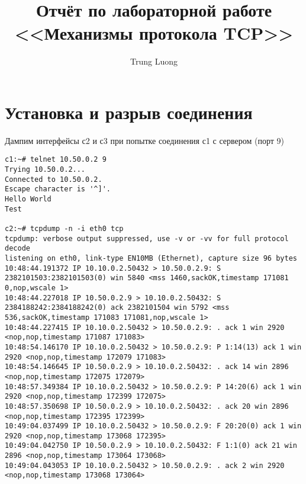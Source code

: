 \documentclass[a4paper,12pt]{article}
\title{Отчёт по лабораторной работе \\ <<Механизмы протокола TCP>>}
\author{Trung Luong}
\begin{document}
\maketitle

\tableofcontents


\section{Установка и разрыв соединения}

Дампим интерфейсы с2 и с3 при попытке соединения с1 с сервером (порт 9)

\begin{lstlisting}
c1:~# telnet 10.50.0.2 9
Trying 10.50.0.2...
Connected to 10.50.0.2.
Escape character is '^]'.
Hello World
Test

c2:~# tcpdump -n -i eth0 tcp
tcpdump: verbose output suppressed, use -v or -vv for full protocol decode
listening on eth0, link-type EN10MB (Ethernet), capture size 96 bytes
10:48:44.191372 IP 10.10.0.2.50432 > 10.50.0.2.9: S 2382101503:2382101503(0) win 5840 <mss 1460,sackOK,timestamp 171081 0,nop,wscale 1>
10:48:44.227018 IP 10.50.0.2.9 > 10.10.0.2.50432: S 2384188242:2384188242(0) ack 2382101504 win 5792 <mss 536,sackOK,timestamp 171083 171081,nop,wscale 1>
10:48:44.227415 IP 10.10.0.2.50432 > 10.50.0.2.9: . ack 1 win 2920 <nop,nop,timestamp 171087 171083>
10:48:54.146170 IP 10.10.0.2.50432 > 10.50.0.2.9: P 1:14(13) ack 1 win 2920 <nop,nop,timestamp 172079 171083>
10:48:54.146645 IP 10.50.0.2.9 > 10.10.0.2.50432: . ack 14 win 2896 <nop,nop,timestamp 172075 172079>
10:48:57.349384 IP 10.10.0.2.50432 > 10.50.0.2.9: P 14:20(6) ack 1 win 2920 <nop,nop,timestamp 172399 172075>
10:48:57.350698 IP 10.50.0.2.9 > 10.10.0.2.50432: . ack 20 win 2896 <nop,nop,timestamp 172395 172399>
10:49:04.037499 IP 10.10.0.2.50432 > 10.50.0.2.9: F 20:20(0) ack 1 win 2920 <nop,nop,timestamp 173068 172395>
10:49:04.042750 IP 10.50.0.2.9 > 10.10.0.2.50432: F 1:1(0) ack 21 win 2896 <nop,nop,timestamp 173064 173068>
10:49:04.043053 IP 10.10.0.2.50432 > 10.50.0.2.9: . ack 2 win 2920 <nop,nop,timestamp 173068 173064>



\end{lstlisting}
\end{document}
